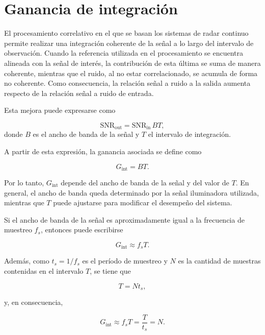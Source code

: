 	\section{Ganancia de integración}

	El procesamiento correlativo en el que se basan los sistemas de radar continuo permite realizar una integración coherente de la señal a lo largo del intervalo de observación. Cuando la referencia utilizada en el procesamiento se encuentra alineada con la señal de interés, la contribución de esta última se suma de manera coherente, mientras que el ruido, al no estar correlacionado, se acumula de forma no coherente. Como consecuencia, la relación señal a ruido a la salida aumenta respecto de la relación señal a ruido de entrada.

	Esta mejora puede expresarse como

	\begin{equation}
	\mathrm{SNR}_{\mathrm{out}} = \mathrm{SNR}_{\mathrm{in}}\, B T,
	\end{equation}
	donde \(B\) es el ancho de banda de la señal y \(T\) el intervalo de integración.

	A partir de esta expresión, la ganancia asociada se define como

	\begin{equation}
	G_{\mathrm{int}} = B T.
	\end{equation}

	Por lo tanto, \(G_{\mathrm{int}}\) depende del ancho de banda de la señal y del valor de \(T\). En general, el ancho de banda queda determinado por la señal iluminadora utilizada, mientras que \(T\) puede ajustarse para modificar el desempeño del sistema.

	Si el ancho de banda de la señal es aproximadamente igual a la frecuencia de muestreo \(f_s\), entonces puede escribirse

	\begin{equation}
	G_{\mathrm{int}} \approx f_s T.
	\end{equation}

	Además, como \(t_s = 1/f_s\) es el período de muestreo y \(N\) es la cantidad de muestras contenidas en el intervalo \(T\), se tiene que

	\begin{equation}
	T = N t_s,
	\end{equation}

	y, en consecuencia,

	\begin{equation}
	G_{\mathrm{int}} \approx f_s T = \frac{T}{t_s} = N.
	\end{equation}

